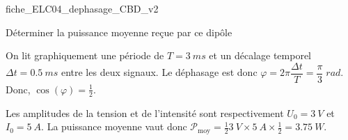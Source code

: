 \begin{center}
{fiche_ELC04_dephasage_CBD_v2}
\end{center}

\debutEntrainement



\begin{enonce}
Déterminer la puissance moyenne reçue par ce dipôle
\end{enonce}


\begin{corrige}
On lit graphiquement une période de $T=\SI{3}{ms}$ et un décalage temporel $\Delta t=\SI{0.5}{ms}$ entre les deux signaux. Le déphasage est donc $\varphi=2\pi\dfrac{\Delta t}{T}=\dfrac{\pi}{3}\;\si{rad}$. Donc, $\cos(\varphi) = \frac{1}{2}$.

Les amplitudes de la tension et de l'intensité sont respectivement $U_{0}=\SI{3}{V}$ et $I_{0}=\SI{5}{A}$. La puissance moyenne vaut donc $\mathcal{P}_{\text{moy}}=\frac{1}{2}\SI{3}{V}\times\SI{5}{A} \times \frac{1}{2}=\SI{3.75}{W}$.
\end{corrige}



\finEntrainement





\newpage




\hauteurLargeurCadreReponse		{8mm}{3.5cm}
\typeEntrainement				{} %
\initialisationEntrainement



